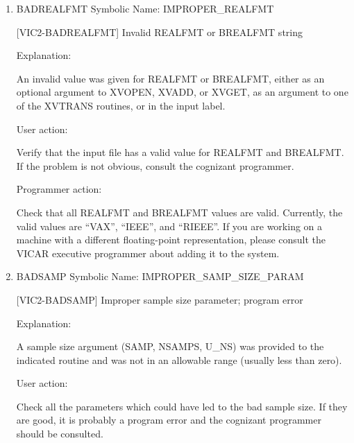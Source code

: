 \begin{enumerate}
 Parameter instance not found in XVPONE

Explanation:

The instance given to the routine XVPONE (or XVIPONE) was not found
in the parameters.

User action:

Verify that all parameters have been given enough values.  If the
problem is not obvious, consult the cognizant programmer.

Programmer action:

Check the counts in the PDF to ensure that the user inputs all
required values.  For optional values, use XVPCNT to get the
number of values given before calling XVPONE.


\item BADREALFMT Symbolic Name: IMPROPER\_REALFMT

[VIC2-BADREALFMT] Invalid REALFMT or BREALFMT string

Explanation:

An invalid value was given for REALFMT or BREALFMT, either as an optional
argument to XVOPEN, XVADD, or XVGET, as an argument to one of the XVTRANS
routines, or in the input label.

User action:

Verify that the input file has a valid value for REALFMT and BREALFMT.
If the problem is not obvious, consult the cognizant programmer.

Programmer action:

Check that all REALFMT and BREALFMT values are valid.  Currently, the
valid values are ``VAX'', ``IEEE'', and ``RIEEE''.  If you are working
on a machine with a different floating-point representation, please
consult the VICAR executive programmer about adding it to the system.


\item BADSAMP Symbolic Name: IMPROPER\_SAMP\_SIZE\_PARAM

[VIC2-BADSAMP] Improper sample size parameter; program error

Explanation:

A sample size argument (SAMP, NSAMPS, U\_NS) was provided to the
indicated routine and was not in an allowable range (usually less
than zero).

User action:

Check all the parameters which could have led to the bad sample size.
If they are good, it is probably a program error and the cognizant
programmer should be consulted.



\end{enumerate}
